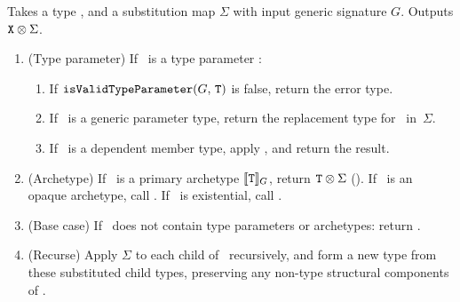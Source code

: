 \documentclass[../generics]{subfiles}
\begin{document}
\begin{algorithm}\label{alg:substitute type}
Takes a type \tX, and a substitution map $\Sigma$ with input generic signature $G$. Outputs $\texttt{X}\otimes\Sigma$.
\begin{enumerate}
\item (Type parameter) If \tX\ is a type parameter \tT:
\begin{enumerate}
\item If $\texttt{isValidTypeParameter}(G,\,\texttt{T})$ is false, return the error type.
\item If \tT\ is a generic parameter type, return the replacement type for \tT\ in~$\Sigma$.
\item If \tT\ is a dependent member type, apply , and return the result.
\end{enumerate}
\item (Archetype) If \tX\ is a primary archetype $[\![\texttt{T}]\!]_G$, return $\texttt{T} \otimes \Sigma$ (). If \tX\ is an opaque archetype, call . If \tX\ is existential, call .
\item (Base case) If \tX\ does not contain type parameters or archetypes: return \tX.
\item (Recurse) Apply $\Sigma$ to each child of \tX\ recursively, and form a new type from these substituted child types, preserving any non-type structural components of \tX.
\end{enumerate}
\end{algorithm}
\end{document}

